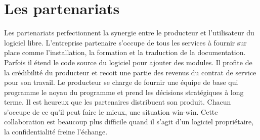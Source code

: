 \section*{Les partenariats}
Les partenariats perfectionnent la synergie entre le producteur et l'utilisateur du logiciel
libre. L'entreprise partenaire s'occupe de tous les services à fournir sur place comme l'installation, la formation et
la traduction de la documentation. Parfois il étend le code source du logiciel pour ajouter des modules. 
Il profite de la crédibilité du producteur et recoit une partie des revenus du contrat de service pour son travail.
Le producteur se charge de fournir une équipe de base qui programme le noyau du programme et 
prend les décisions stratégiques à long terme. Il est heureux que les partenaires
distribuent son produit. Chacun s'occupe de ce qu'il peut faire le mieux, une situation win-win.
Cette collaboration est beaucoup plus difficile
quand il s'agit d'un logiciel propriétaire, la confidentialité freine l'échange.

	